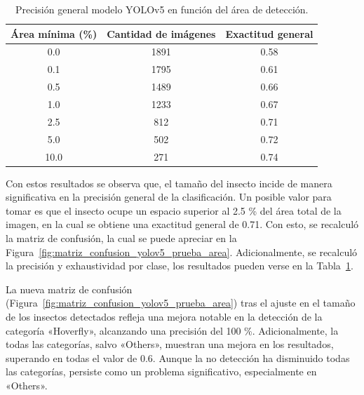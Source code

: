 \begin{table}[H]
    \centering\small
    \begin{tabular}{ccc}
    \toprule
          \textbf{Área mínima (\%)} & \textbf{Cantidad de imágenes}  &  \textbf{Exactitud general}\\ 
    \midrule
        0.0 & 1891 & 0.58 \\
        0.1 & 1795 & 0.61 \\
        0.5 & 1489 & 0.66 \\
        1.0 & 1233 & 0.67 \\
        2.5 & 812 & 0.71 \\
        5.0 & 502 & 0.72 \\
        10.0 & 271 & 0.74 \\
    \bottomrule
    \end{tabular}
    \caption{Precisión general modelo YOLOv5 en función del área de detección.}
    \label{tab:metricas_area}
\end{table}

Con estos resultados se observa que, el tamaño del insecto incide de manera significativa en la precisión general de la clasificación. Un posible valor para tomar es que el insecto ocupe un espacio superior al 2.5 \% del área total de la imagen, en la cual se obtiene una exactitud general de 0.71. Con esto, se recalculó la matriz de confusión, la cual se puede apreciar en la Figura~\ref{fig:matriz_confusion_yolov5_prueba_area}. Adicionalmente, se recalculó la precisión y exhaustividad por clase, los resultados pueden verse en la Tabla~\ref{tab:metricas_area}. 


La nueva matriz de confusión (Figura~\ref{fig:matriz_confusion_yolov5_prueba_area}) tras el ajuste en el tamaño de los insectos detectados refleja una mejora notable en la detección de la categoría «Hoverfly», alcanzando una precisión del 100 \%. Adicionalmente, la todas las categorías, salvo «Others», muestran una mejora en los resultados, superando en todas el valor de 0.6. Aunque la no detección ha disminuido todas las categorías, persiste como un problema significativo, especialmente en «Others».

